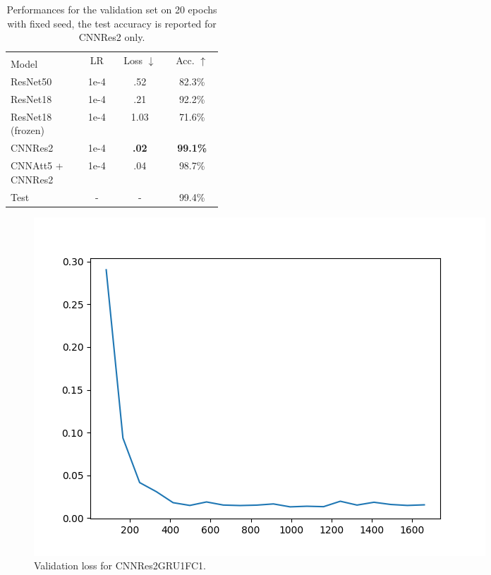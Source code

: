 \documentclass{article}
\begin{document}
\begin{table}
    \caption{Performances for the validation set on 20 epochs with fixed seed, the test accuracy is reported for CNNRes2 only.}
    \label{tab:joint-results}
    \begin{center}
        \begin{small}
            \begin{tabular}{p{0.35\linewidth} | ccc}
                \toprule
                & \multirow{2}{0.13\linewidth}{LR} 
                & \multirow{2}{0.13\linewidth}{Loss $\downarrow$} 
                & \multirow{2}{0.13\linewidth}{Acc. $\uparrow$} \\
                Model \\
                \midrule
                ResNet50 & 1e-4 & .52 & 82.3\% \\
                ResNet18 & 1e-4 & .21 & 92.2\% \\
                ResNet18 (frozen) & 1e-4 & 1.03 & 71.6\% \\
                CNNRes2 & 1e-4 & \textbf{.02} & \textbf{99.1\%} \\
                CNNAtt5 + CNNRes2 & 1e-4 & .04 & 98.7\% \\
                \midrule
                \midrule
                Test & - & - & 99.4\% \\
                \bottomrule
            \end{tabular}
        \end{small}
    \end{center}
    \vspace{-0.5cm}
\end{table}

\begin{figure}
    \centering
    \includegraphics[scale=.5]{images/val_loss.png}
    \caption{Validation loss for CNNRes2GRU1FC1.}
    \label{fig:val-loss}
\end{figure}
\end{document}
